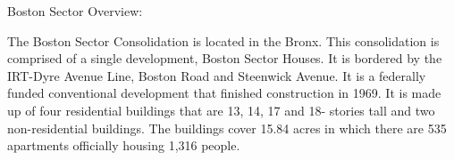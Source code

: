 Boston Sector Overview:     

   

The Boston Sector Consolidation is located in the Bronx. This consolidation is comprised of a single development, Boston Sector Houses. It is bordered by the IRT-Dyre Avenue Line, Boston Road and Steenwick Avenue. It is a federally funded conventional development that finished construction in 1969. It is made up of four residential buildings that are 13, 14, 17 and 18- stories tall and two non-residential buildings. The buildings cover 15.84 acres in which there are 535 apartments officially housing 1,316 people. 
